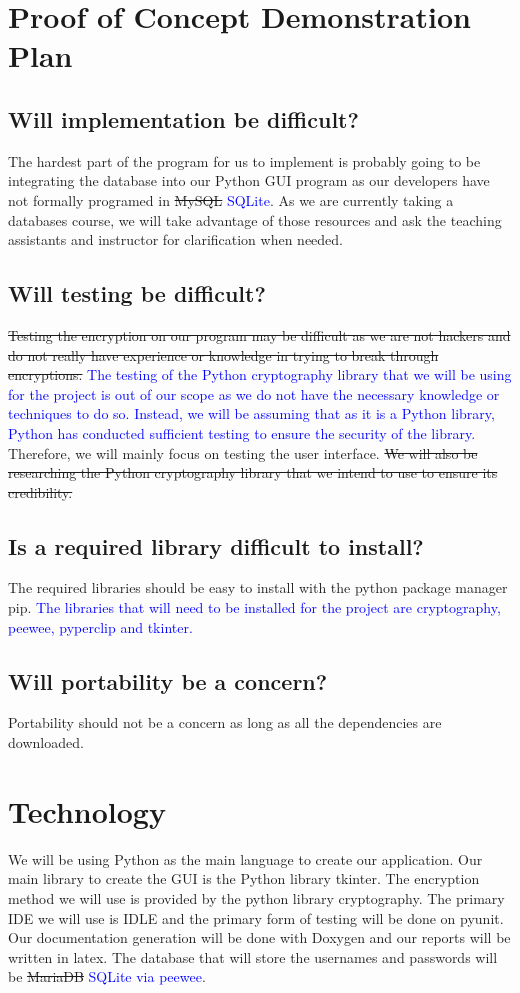 \documentclass{article}
\begin{document}
\section{Proof of Concept Demonstration Plan}
\subsection{Will implementation be difficult?}
The hardest part of the program for us to implement is probably going to be integrating the database into our Python GUI program as our developers have not formally programed in \sout{MySQL} \textcolor{blue}{SQLite}. As we are currently taking a databases course, we will take advantage of those resources and ask the teaching assistants and instructor for clarification when needed.
\subsection{Will testing be difficult?}
\sout{Testing the encryption on our program may be difficult as we are not hackers and do not really have experience or knowledge in trying to break through encryptions.} \textcolor{blue}{The testing of the Python cryptography library that we will be using for the project is out of our scope as we do not have the necessary knowledge or techniques to do so. Instead, we will be assuming that as it is a Python library, Python has conducted sufficient testing to ensure the security of the library.} Therefore, we will mainly focus on testing the user interface. \sout{We will also be researching the Python cryptography library that we intend to use to ensure its credibility.}
\subsection{Is a required library difficult to install?}
The required libraries should be easy to install with the python package manager pip. \textcolor{blue}{The libraries that will need to be installed for the project are cryptography, peewee, pyperclip and tkinter.}
\subsection{Will portability be a concern?}
Portability should not be a concern as long as all the dependencies are downloaded.

\section{Technology}
We will be using Python as the main language to create our application. Our main library to create the GUI is the Python library tkinter. The encryption method we will use is provided by the python library cryptography. The primary IDE we will use is IDLE and the primary form of testing will be done on pyunit. Our documentation generation will be done with Doxygen and our reports will be written in latex. The database that will store the usernames and passwords will be \sout{MariaDB} \textcolor{blue}{SQLite via peewee}.
\end{document}
